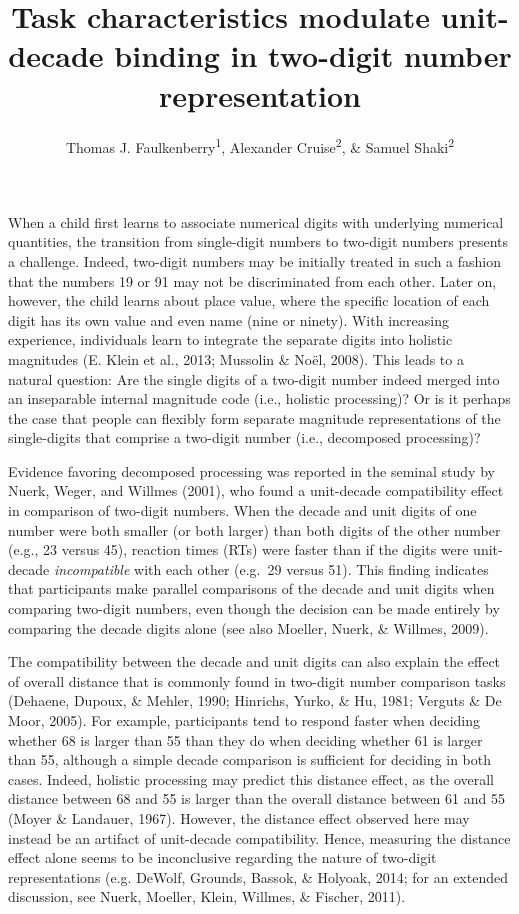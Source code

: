 \documentclass[english,man]{apa6}
\title{Task characteristics modulate unit-decade binding in two-digit number
representation}
\author{Thomas J. Faulkenberry\textsuperscript{1}, Alexander Cruise\textsuperscript{2}, \& Samuel Shaki\textsuperscript{2}}
\affiliation{
    \vspace{0.5cm}
          \textsuperscript{1} Tarleton State University\\
          \textsuperscript{2} Ariel University  }
\theoremstyle{definition}
\theoremstyle{definition}
\theoremstyle{definition}
\theoremstyle{remark}
\begin{document}
\maketitle

\setcounter{secnumdepth}{0}



When a child first learns to associate numerical digits with underlying
numerical quantities, the transition from single-digit numbers to
two-digit numbers presents a challenge. Indeed, two-digit numbers may be
initially treated in such a fashion that the numbers 19 or 91 may not be
discriminated from each other. Later on, however, the child learns about
place value, where the specific location of each digit has its own value
and even name (nine or ninety). With increasing experience, individuals
learn to integrate the separate digits into holistic magnitudes (E.
Klein et al., 2013; Mussolin \& Noël, 2008). This leads to a natural
question: Are the single digits of a two-digit number indeed merged into
an inseparable internal magnitude code (i.e., holistic processing)? Or
is it perhaps the case that people can flexibly form separate magnitude
representations of the single-digits that comprise a two-digit number
(i.e., decomposed processing)?

Evidence favoring decomposed processing was reported in the seminal
study by Nuerk, Weger, and Willmes (2001), who found a unit-decade
compatibility effect in comparison of two-digit numbers. When the decade
and unit digits of one number were both smaller (or both larger) than
both digits of the other number (e.g., 23 versus 45), reaction times
(RTs) were faster than if the digits were unit-decade
\emph{incompatible} with each other (e.g.~29 versus 51). This finding
indicates that participants make parallel comparisons of the decade and
unit digits when comparing two-digit numbers, even though the decision
can be made entirely by comparing the decade digits alone (see also
Moeller, Nuerk, \& Willmes, 2009).

The compatibility between the decade and unit digits can also explain
the effect of overall distance that is commonly found in two-digit
number comparison tasks (Dehaene, Dupoux, \& Mehler, 1990; Hinrichs,
Yurko, \& Hu, 1981; Verguts \& De Moor, 2005). For example, participants
tend to respond faster when deciding whether 68 is larger than 55 than
they do when deciding whether 61 is larger than 55, although a simple
decade comparison is sufficient for deciding in both cases. Indeed,
holistic processing may predict this distance effect, as the overall
distance between 68 and 55 is larger than the overall distance between
61 and 55 (Moyer \& Landauer, 1967). However, the distance effect
observed here may instead be an artifact of unit-decade compatibility.
Hence, measuring the distance effect alone seems to be inconclusive
regarding the nature of two-digit representations (e.g. DeWolf, Grounds,
Bassok, \& Holyoak, 2014; for an extended discussion, see Nuerk,
Moeller, Klein, Willmes, \& Fischer, 2011).
\end{document}
